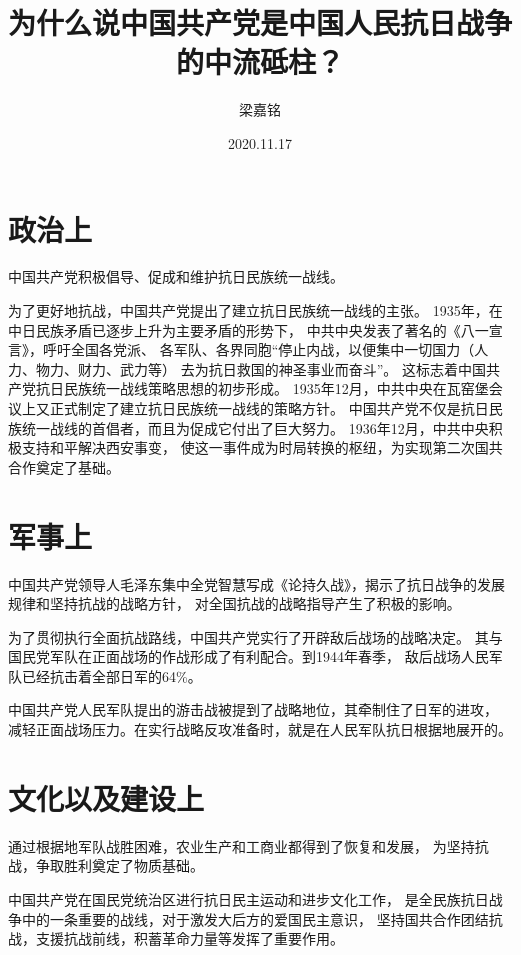 \documentclass[a4paper]{article}
\title{\heiti\zihao{3} 为什么说中国共产党是中国人民抗日战争的中流砥柱？}
\author{\songti 梁嘉铭}
\date{2020.11.17}
\begin{document}
\maketitle
\section{政治上}
中国共产党积极倡导、促成和维护抗日民族统一战线。
\par
为了更好地抗战，中国共产党提出了建立抗日民族统一战线的主张。
1935年，在中日民族矛盾已逐步上升为主要矛盾的形势下，
中共中央发表了著名的《八一宣言》，呼吁全国各党派、
各军队、各界同胞“停止内战，以便集中一切国力（人力、物力、财力、武力等）
去为抗日救国的神圣事业而奋斗”。
这标志着中国共产党抗日民族统一战线策略思想的初步形成。
1935年12月，中共中央在瓦窑堡会议上又正式制定了建立抗日民族统一战线的策略方针。
中国共产党不仅是抗日民族统一战线的首倡者，而且为促成它付出了巨大努力。
1936年12月，中共中央积极支持和平解决西安事变，
使这一事件成为时局转换的枢纽，为实现第二次国共合作奠定了基础。
\maketitle
\section{军事上}
中国共产党领导人毛泽东集中全党智慧写成《论持久战》，揭示了抗日战争的发展规律和坚持抗战的战略方针，
对全国抗战的战略指导产生了积极的影响。
\par
为了贯彻执行全面抗战路线，中国共产党实行了开辟敌后战场的战略决定。
其与国民党军队在正面战场的作战形成了有利配合。到1944年春季，
敌后战场人民军队已经抗击着全部日军的64\%。
\par
中国共产党人民军队提出的游击战被提到了战略地位，其牵制住了日军的进攻，
减轻正面战场压力。在实行战略反攻准备时，就是在人民军队抗日根据地展开的。
\maketitle
\section{文化以及建设上}
通过根据地军队战胜困难，农业生产和工商业都得到了恢复和发展，
为坚持抗战，争取胜利奠定了物质基础。
\par
中国共产党在国民党统治区进行抗日民主运动和进步文化工作，
是全民族抗日战争中的一条重要的战线，对于激发大后方的爱国民主意识，
坚持国共合作团结抗战，支援抗战前线，积蓄革命力量等发挥了重要作用。
\maketitle
\end{document}
